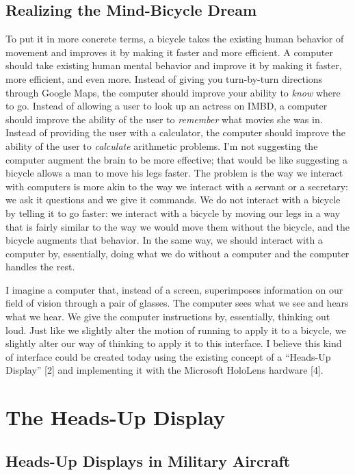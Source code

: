 \documentclass[a4paper,12pt]{article}
\begin{document}
\subsection{Realizing the Mind-Bicycle Dream}
To put it in more concrete terms, a bicycle takes the existing human behavior of movement and improves it by making it faster and more efficient. A computer should take existing human mental behavior and improve it by making it faster, more efficient, and even more. Instead of giving you turn-by-turn directions through Google Maps, the computer should improve your ability to \emph{know} where to go. Instead of allowing a user to look up an actress on IMBD, a computer should improve the ability of the user to \emph{remember} what movies she was in. Instead of providing the user with a calculator, the computer should improve the ability of the user to \emph{calculate} arithmetic problems. I'm not suggesting the computer augment the brain to be more effective; that would be like suggesting a bicycle allows a man to move his legs faster. The problem is the way we interact with computers is more akin to the way we interact with a servant or a secretary: we ask it questions and we give it commands. We do not interact with a bicycle by telling it to go faster: we interact with a bicycle by moving our legs in a way that is fairly similar to the way we would move them without the bicycle, and the bicycle augments that behavior. In the same way, we should interact with a computer by, essentially, doing what we do without a computer and the computer handles the rest.

I imagine a computer that, instead of a screen, superimposes information on our field of vision through a pair of glasses. The computer sees what we see and hears what we hear. We give the computer instructions by, essentially, thinking out loud. Just like we slightly alter the motion of running to apply it to a bicycle, we slightly alter our way of thinking to apply it to this interface. I believe this kind of interface could be created today using the existing concept of a ``Heads-Up Display'' [2] and implementing it with the Microsoft HoloLens hardware [4].

\section{The Heads-Up Display}

\subsection{Heads-Up Displays in Military Aircraft}
\end{document}
